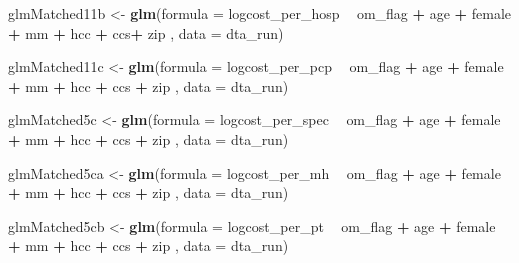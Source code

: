 \documentclass[]{article}
\newenvironment{Shaded}{\begin{snugshade}}{\end{snugshade}}
\newcommand{\KeywordTok}[1]{\textcolor[rgb]{0.13,0.29,0.53}{\textbf{#1}}}
\newcommand{\DataTypeTok}[1]{\textcolor[rgb]{0.13,0.29,0.53}{#1}}
\newcommand{\StringTok}[1]{\textcolor[rgb]{0.31,0.60,0.02}{#1}}
\newcommand{\OperatorTok}[1]{\textcolor[rgb]{0.81,0.36,0.00}{\textbf{#1}}}
\newcommand{\NormalTok}[1]{#1}
\begin{document}
\begin{Shaded}
\begin{Highlighting}[]
\NormalTok{glmMatched11b <-}\StringTok{ }\KeywordTok{glm}\NormalTok{(}\DataTypeTok{formula =}\NormalTok{ logcost_per_hosp }\OperatorTok{~}\StringTok{ }\NormalTok{om_flag }\OperatorTok{+}\StringTok{ }\NormalTok{age }\OperatorTok{+}\StringTok{ }\NormalTok{female }\OperatorTok{+}\StringTok{ }\NormalTok{mm }\OperatorTok{+}\StringTok{ }\NormalTok{hcc }\OperatorTok{+}\StringTok{ }\NormalTok{ccs}\OperatorTok{+}\StringTok{ }\NormalTok{zip  ,}
                   \DataTypeTok{data    =}\NormalTok{ dta_run)}

\NormalTok{glmMatched11c <-}\StringTok{ }\KeywordTok{glm}\NormalTok{(}\DataTypeTok{formula =}\NormalTok{ logcost_per_pcp }\OperatorTok{~}\StringTok{ }\NormalTok{om_flag }\OperatorTok{+}\StringTok{ }\NormalTok{age }\OperatorTok{+}\StringTok{ }\NormalTok{female }\OperatorTok{+}\StringTok{ }\NormalTok{mm }\OperatorTok{+}\StringTok{ }\NormalTok{hcc }\OperatorTok{+}\StringTok{ }\NormalTok{ccs }\OperatorTok{+}\StringTok{ }\NormalTok{zip ,}
                   \DataTypeTok{data    =}\NormalTok{ dta_run)}


\NormalTok{glmMatched5c <-}\StringTok{ }\KeywordTok{glm}\NormalTok{(}\DataTypeTok{formula =}\NormalTok{ logcost_per_spec }\OperatorTok{~}\StringTok{ }\NormalTok{om_flag }\OperatorTok{+}\StringTok{ }\NormalTok{age }\OperatorTok{+}\StringTok{ }\NormalTok{female }\OperatorTok{+}\StringTok{ }\NormalTok{mm }\OperatorTok{+}\StringTok{ }\NormalTok{hcc }\OperatorTok{+}\StringTok{ }\NormalTok{ccs }\OperatorTok{+}\StringTok{ }\NormalTok{zip ,}
                   \DataTypeTok{data    =}\NormalTok{ dta_run)}


\NormalTok{glmMatched5ca <-}\StringTok{ }\KeywordTok{glm}\NormalTok{(}\DataTypeTok{formula =}\NormalTok{ logcost_per_mh }\OperatorTok{~}\StringTok{ }\NormalTok{om_flag }\OperatorTok{+}\StringTok{ }\NormalTok{age }\OperatorTok{+}\StringTok{ }\NormalTok{female }\OperatorTok{+}\StringTok{ }\NormalTok{mm }\OperatorTok{+}\StringTok{ }\NormalTok{hcc }\OperatorTok{+}\StringTok{ }\NormalTok{ccs }\OperatorTok{+}\StringTok{ }\NormalTok{zip ,}
                    \DataTypeTok{data    =}\NormalTok{ dta_run)}


\NormalTok{glmMatched5cb <-}\StringTok{ }\KeywordTok{glm}\NormalTok{(}\DataTypeTok{formula =}\NormalTok{ logcost_per_pt }\OperatorTok{~}\StringTok{ }\NormalTok{om_flag }\OperatorTok{+}\StringTok{ }\NormalTok{age }\OperatorTok{+}\StringTok{ }\NormalTok{female }\OperatorTok{+}\StringTok{ }\NormalTok{mm }\OperatorTok{+}\StringTok{ }\NormalTok{hcc }\OperatorTok{+}\StringTok{ }\NormalTok{ccs }\OperatorTok{+}\StringTok{ }\NormalTok{zip ,}
                    \DataTypeTok{data    =}\NormalTok{ dta_run)}




\end{Highlighting}
\end{Shaded}
\end{document}
